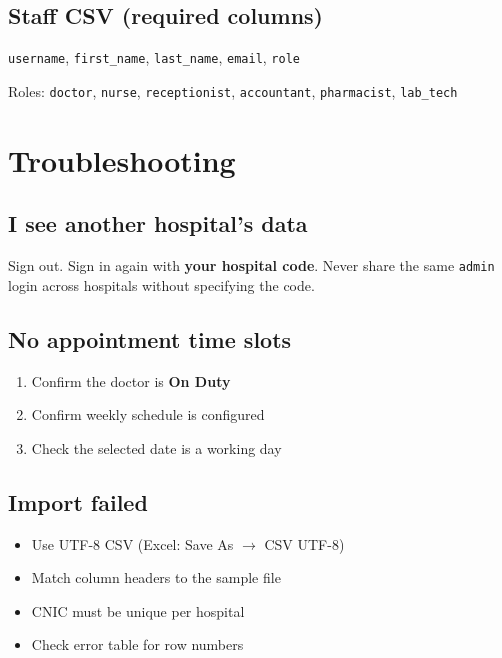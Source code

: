 \documentclass[11pt,a4paper]{report}
\begin{document}
\section{Staff CSV (required columns)}

\texttt{username}, \texttt{first\_name}, \texttt{last\_name}, \texttt{email}, \texttt{role}

Roles: \texttt{doctor}, \texttt{nurse}, \texttt{receptionist}, \texttt{accountant}, \texttt{pharmacist}, \texttt{lab\_tech}

\chapter{Troubleshooting}

\section{I see another hospital's data}

Sign out. Sign in again with \textbf{your hospital code}. Never share the same \texttt{admin} login across hospitals without specifying the code.

\section{No appointment time slots}

\begin{enumerate}[noitemsep]
    \item Confirm the doctor is \textbf{On Duty}
    \item Confirm weekly schedule is configured
    \item Check the selected date is a working day
\end{enumerate}

\section{Import failed}

\begin{itemize}[noitemsep]
    \item Use UTF-8 CSV (Excel: Save As $\rightarrow$ CSV UTF-8)
    \item Match column headers to the sample file
    \item CNIC must be unique per hospital
    \item Check error table for row numbers
\end{itemize}
\end{document}
